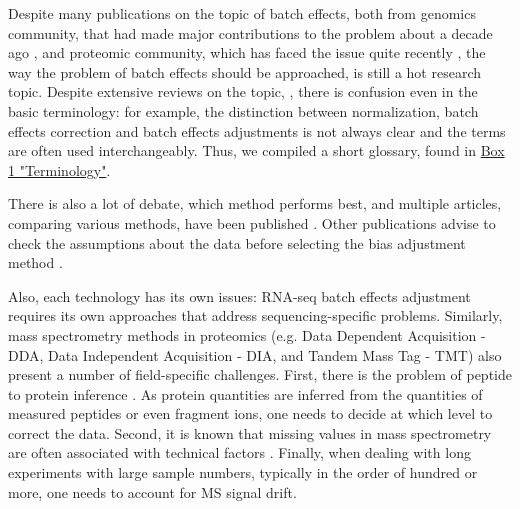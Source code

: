 \documentclass[num-refs]{wiley-article}
\begin{document}
Despite many publications on the topic of batch effects, both from genomics community, that had made major contributions to the problem about a decade ago \cite{Leek:2010aa, Lazar:2013aa, Luo2010, Chen:2011ac, Dillies:2013aa, Chawade:2014aa}, and proteomic community, which has faced the issue quite recently \cite{Karpievitch2012, Chawade:2014aa, Valikangas2018, Gregori2012}, the way the problem of batch effects should be approached, is still a hot research topic. Despite extensive reviews on the topic, \cite{Lazar:2013aa, Leek:2010aa}, there is confusion even in the basic terminology: for example, the distinction between normalization, batch effects correction and batch effects adjustments is not always clear and the terms are often used interchangeably. Thus, we compiled a short glossary, found in \hyperref[box:Box1_definitions]{Box 1 "Terminology"}. 

There is also a lot of debate, which method performs best, and multiple articles, comparing various methods, have been published \cite{Luo2010, Chen:2011ac, Chawade:2014aa}. Other publications advise to check the assumptions about the data before selecting the bias adjustment method \cite{Evans:2018aa, GOH2017498}. 

Also, each technology has its own issues: RNA-seq batch effects adjustment requires its own approaches\cite{Dillies:2013aa} that address sequencing-specific problems. Similarly, mass spectrometry methods in proteomics  (e.g. Data Dependent Acquisition - DDA, Data Independent Acquisition - DIA, and Tandem Mass Tag - TMT) also present a number of field-specific challenges. First, there is the problem of peptide to protein inference \cite{Clough:2012aa, Teo:2015aa, Rosenberger2014a, Choi2014, Muntel:2019aa}. As protein quantities are inferred from the quantities of measured peptides or even fragment ions, one needs to decide at which level to correct the data. Second, it is known that missing values in mass spectrometry are often associated with technical factors \cite{Karpievitch2012, Matafora2017}. Finally, when dealing with long experiments with large sample numbers, typically in the order of hundred or more, one needs to account for MS signal drift. 
\end{document}
